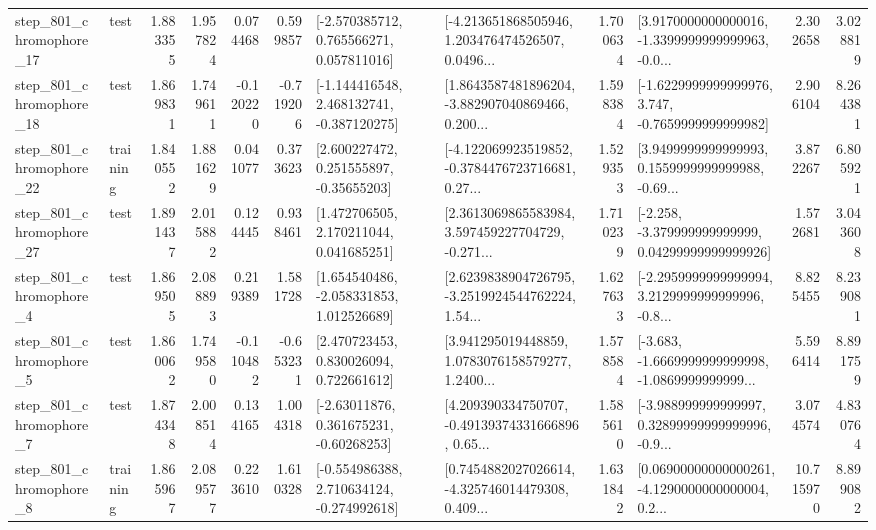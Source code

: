 \begin{tabular}{llrrrrllrlrr}
  step\_801\_chromophore\_17 &      test &      1.883355 &    1.957824 &      0.074468 &  0.599857 &    [-2.570385712, 0.765566271, 0.057811016] &  [-4.213651868505946, 1.203476474526507, 0.0496... &       1.700634 &  [3.9170000000000016, -1.3399999999999963, -0.0... &            2.302658 &          3.028819 \\
  step\_801\_chromophore\_18 &      test &      1.869831 &    1.749611 &     -0.120220 & -0.719206 &   [-1.144416548, 2.468132741, -0.387120275] &  [1.8643587481896204, -3.882907040869466, 0.200... &       1.598384 &  [-1.6229999999999976, 3.747, -0.7659999999999982] &            2.906104 &          8.264381 \\
  step\_801\_chromophore\_22 &  training &      1.840552 &    1.881629 &      0.041077 &  0.373623 &     [2.600227472, 0.251555897, -0.35655203] &  [-4.122069923519852, -0.3784476723716681, 0.27... &       1.529353 &  [3.9499999999999993, 0.1559999999999988, -0.69... &            3.872267 &          6.805921 \\
  step\_801\_chromophore\_27 &      test &      1.891437 &    2.015882 &      0.124445 &  0.938461 &     [1.472706505, 2.170211044, 0.041685251] &  [2.3613069865583984, 3.597459227704729, -0.271... &       1.710239 &  [-2.258, -3.379999999999999, 0.04299999999999926] &            1.572681 &          3.043608 \\
   step\_801\_chromophore\_4 &      test &      1.869505 &    2.088893 &      0.219389 &  1.581728 &    [1.654540486, -2.058331853, 1.012526689] &  [2.6239838904726795, -3.2519924544762224, 1.54... &       1.627633 &  [-2.2959999999999994, 3.2129999999999996, -0.8... &            8.825455 &          8.239081 \\
   step\_801\_chromophore\_5 &      test &      1.860062 &    1.749580 &     -0.110482 & -0.653231 &     [2.470723453, 0.830026094, 0.722661612] &  [3.941295019448859, 1.0783076158579277, 1.2400... &       1.578584 &  [-3.683, -1.6669999999999998, -1.0869999999999... &            5.596414 &          8.891759 \\
   step\_801\_chromophore\_7 &      test &      1.874348 &    2.008514 &      0.134165 &  1.004318 &     [-2.63011876, 0.361675231, -0.60268253] &  [4.209390334750707, -0.49139374331666896, 0.65... &       1.585610 &  [-3.988999999999997, 0.32899999999999996, -0.9... &            3.074574 &          4.830764 \\
   step\_801\_chromophore\_8 &  training &      1.865967 &    2.089577 &      0.223610 &  1.610328 &   [-0.554986388, 2.710634124, -0.274992618] &  [0.7454882027026614, -4.325746014479308, 0.409... &       1.631842 &  [0.06900000000000261, -4.1290000000000004, 0.2... &           10.715970 &          8.899082 \\

\end{tabular}
